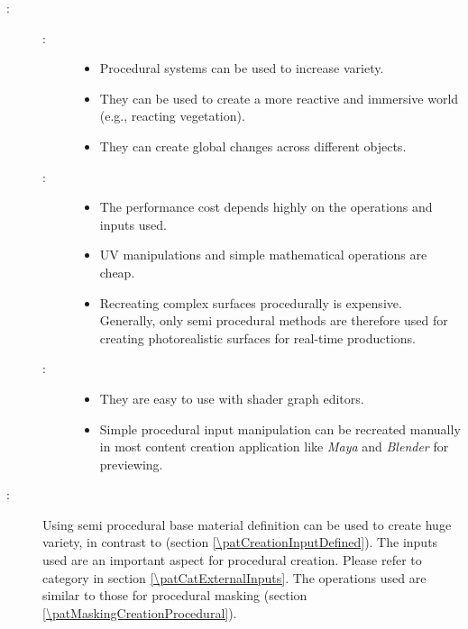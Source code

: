 \begin{description}
	\item[\patConsequences:]\hfill
		\begin{description}
			\item[\visual:]\hfill
				\begin{itemize}\mynobreakpar
					\item Procedural systems can be used to increase variety.
					\item They can be used to create a more reactive and immersive world (e.g., reacting vegetation).
					\item They can create global changes across different objects.
				\end{itemize}
			\item[\performance:]\hfill
				\begin{itemize}\mynobreakpar
					\item The performance cost depends highly on the operations and inputs used. 
					\item UV manipulations and simple mathematical operations are cheap.
					\item Recreating complex surfaces procedurally is expensive. Generally, only semi procedural methods are therefore used for creating photorealistic surfaces for real-time productions. 
				\end{itemize}
			\item[\pipeline:]\hfill
				\begin{itemize}\mynobreakpar
					\item They are easy to use with shader graph editors.
					\item Simple procedural input manipulation can be recreated manually in most content creation application like \emph{Maya} and \emph{Blender} for previewing.  
				\end{itemize}
		\end{description}

	\item[\patRelations:]%
	Using semi procedural base material definition can be used to create huge variety, in contrast to \emph{\patCreationInputDefined} (section \ref{\patCreationInputDefined}). The inputs used are an important aspect for procedural creation. Please refer to category \emph{\patCatExternalInputs} in section \ref{\patCatExternalInputs}. The operations used are similar to those for procedural masking \emph{\patMaskingCreationProcedural} (section \ref{\patMaskingCreationProcedural}).
\end{description}




